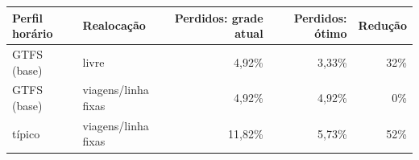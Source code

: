 \begin{tabular}{llrrr}
\toprule
Perfil horário & Realocação & Perdidos: grade atual & Perdidos: ótimo & Redução \\
\midrule
GTFS (base) & livre & 4{,}92\% & 3{,}33\% & 32\% \\
GTFS (base) & viagens/linha fixas & 4{,}92\% & 4{,}92\% & 0\% \\
típico & viagens/linha fixas & 11{,}82\% & 5{,}73\% & 52\% \\
\bottomrule
\end{tabular}
